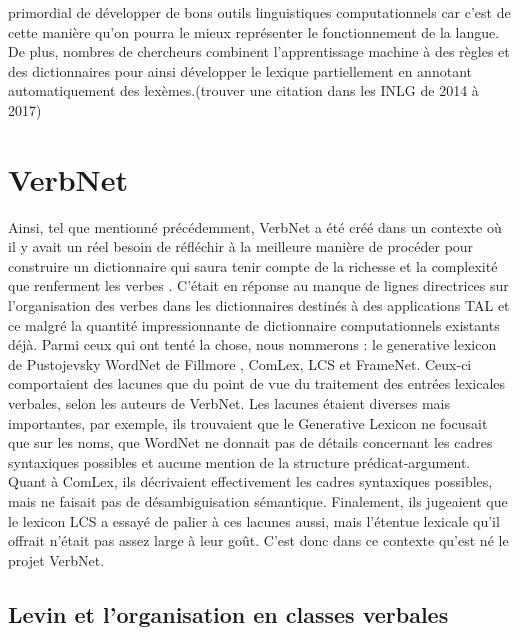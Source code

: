 primordial de développer de bons outils linguistiques computationnels car c'est de cette manière qu'on pourra le mieux représenter le fonctionnement de la langue. De plus, nombres de chercheurs combinent l'apprentissage machine à des règles et des dictionnaires pour ainsi développer le lexique partiellement en annotant automatiquement des lexèmes.(trouver une citation dans les INLG de 2014 à 2017)

\section{VerbNet}

Ainsi, tel que mentionné précédemment, VerbNet a été créé dans un contexte où il y avait un réel besoin de réfléchir à la meilleure manière de procéder pour construire un dictionnaire qui saura tenir compte de la richesse et la complexité que renferment les verbes \citep{KipperClassBasedConstructionVerb2000}. C'était en réponse au manque de lignes directrices sur l'organisation des verbes dans les dictionnaires destinés à des applications TAL et ce malgré la quantité impressionnante de dictionnaire computationnels existants déjà. Parmi ceux qui ont tenté la chose, nous nommerons : le generative lexicon de Pustojevsky \citep{PustejovskyGenerativeLexicon1991} WordNet de Fillmore \citep{MillerWordNetLexicalDatabase1995}, ComLex\citep{Grishman:1994:CSB:991886.991931}, LCS\citep{13776} et FrameNet\citep{BakerBerkeleyFrameNetProject1998}. Ceux-ci comportaient des lacunes que du point de vue du traitement des entrées lexicales verbales, selon les auteurs de VerbNet. Les lacunes étaient diverses mais importantes, par exemple, ils trouvaient que le Generative Lexicon ne focusait que sur les noms, que WordNet ne donnait pas de détails concernant les cadres syntaxiques possibles  et aucune mention de la structure prédicat-argument. Quant à ComLex, ils décrivaient effectivement les cadres syntaxiques possibles, mais ne faisait pas de désambiguisation sémantique. Finalement, ils jugeaient que le lexicon LCS a essayé de palier à ces lacunes aussi, mais l'étentue lexicale qu'il offrait n'était pas assez large à leur goût\citep{SchulerVerbnetBroadcoverageComprehensive2005}. C'est donc dans ce contexte qu'est né le projet VerbNet.

\subsection{Levin et l'organisation en classes verbales}

